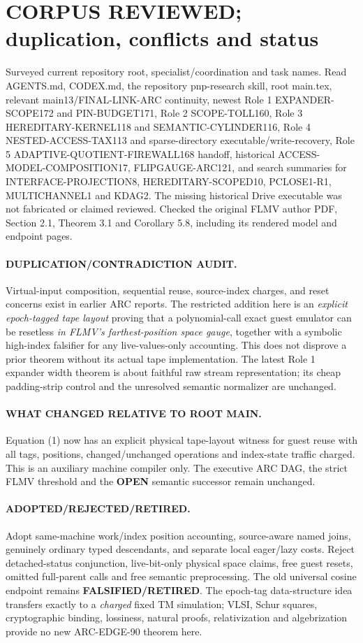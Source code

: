 \documentclass[11pt]{article}
\begin{document}
\section{CORPUS REVIEWED; duplication, conflicts and status}
Surveyed current repository root, specialist/coordination and task names. Read AGENTS.md, CODEX.md, the repository pnp-research skill, root main.tex, relevant main13/FINAL-LINK-ARC continuity, newest Role 1 EXPANDER-SCOPE172 and PIN-BUDGET171, Role 2 SCOPE-TOLL160, Role 3 HEREDITARY-KERNEL118 and SEMANTIC-CYLINDER116, Role 4 NESTED-ACCESS-TAX113 and sparse-directory executable/write-recovery, Role 5 ADAPTIVE-QUOTIENT-FIREWALL168 handoff, historical ACCESS-MODEL-COMPOSITION17, FLIPGAUGE-ARC121, and search summaries for INTERFACE-PROJECTION8, HEREDITARY-SCOPED10, PCLOSE1-R1, MULTICHANNEL1 and KDAG2. The missing historical Drive executable was not fabricated or claimed reviewed. Checked the original FLMV author PDF, Section 2.1, Theorem 3.1 and Corollary 5.8, including its rendered model and endpoint pages.

\paragraph{DUPLICATION/CONTRADICTION AUDIT.}
Virtual-input composition, sequential reuse, source-index charges, and reset concerns exist in earlier ARC reports. The restricted addition here is an \emph{explicit epoch-tagged tape layout} proving that a polynomial-call exact guest emulator can be resetless \emph{in FLMV's farthest-position space gauge}, together with a symbolic high-index falsifier for any live-values-only accounting. This does not disprove a prior theorem without its actual tape implementation. The latest Role 1 expander width theorem is about faithful raw stream representation; its cheap padding-strip control and the unresolved semantic normalizer are unchanged.

\paragraph{WHAT CHANGED RELATIVE TO ROOT MAIN.}
Equation (1) now has an explicit physical tape-layout witness for guest reuse with all tags, positions, changed/unchanged operations and index-state traffic charged. This is an auxiliary machine compiler only. The executive ARC DAG, the strict FLMV threshold and the \textbf{OPEN} semantic successor remain unchanged.

\paragraph{ADOPTED/REJECTED/RETIRED.}
Adopt same-machine work/index position accounting, source-aware named joins, genuinely ordinary typed descendants, and separate local eager/lazy costs. Reject detached-status conjunction, live-bit-only physical space claims, free guest resets, omitted full-parent calls and free semantic preprocessing. The old universal cosine endpoint remains \textbf{FALSIFIED/RETIRED}. The epoch-tag data-structure idea transfers exactly to a \emph{charged} fixed TM simulation; VLSI, Schur squares, cryptographic binding, lossiness, natural proofs, relativization and algebrization provide no new ARC-EDGE-90 theorem here.
\end{document}
